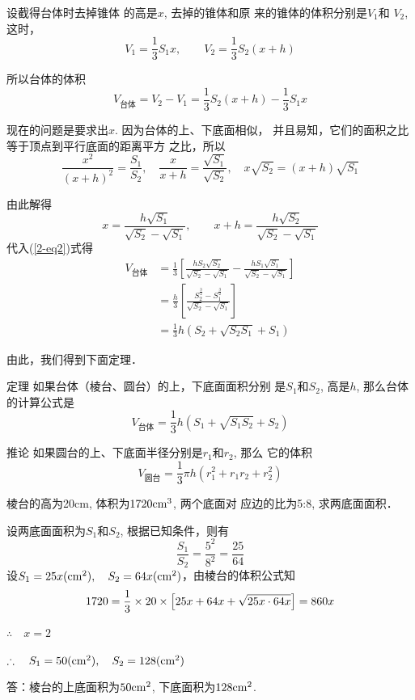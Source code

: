 设截得台体时去掉锥体
的高是$x$, 去掉的锥体和原
来的锥体的体积分别是$V_1$和
$V_2$, 这时，
\[V_1=\frac{1}{3}S_1 x,\qquad V_2=\frac{1}{3}S_2(x+h)\]

所以台体的体积
\begin{equation}\label{2-eq2}
    V_{\text{台体}}=V_2-V_1=\frac{1}{3}S_2(x+h)-\frac{1}{3}S_1x
\end{equation}

现在的问题是要求出$x$. 因为台体的上、下底面相似，
并且易知，它们的面积之比等于顶点到平行底面的距离平方
之比，所以
\[\frac{x^2}{(x+h)^2}=\frac{S_1}{S_2},\quad \frac{x}{x+h}=\frac{\sqrt{S_1}}{\sqrt{S_2}},\quad x\sqrt{S_2}=(x+h)\sqrt{S_1}\]

由此解得
\[x=\frac{h\sqrt{S_1}}{\sqrt{S_2}-\sqrt{S_1}},\qquad x+h=\frac{h\sqrt{S_2}}{\sqrt{S_2}-\sqrt{S_1}}\]
代入(\ref{2-eq2})式得
\[\begin{split}
    V_{\text{台体}}&=\frac{1}{3}\left[\frac{hS_2\sqrt{S_2}}{\sqrt{S_2}-\sqrt{S_1}}-\frac{hS_1\sqrt{S_1}}{\sqrt{S_2}-\sqrt{S_1}}\right]\\
    &=\frac{h}{3}\left[\frac{S_2^{\tfrac{3}{2}}-S_1^{\tfrac{3}{2}}}{\sqrt{S_2}-\sqrt{S_1}}\right]\\
    &=\frac{1}{3}h\left(S_2+\sqrt{S_2S_1}+S_1\right)
\end{split}\]

由此，我们得到下面定理．

\begin{blk}
{定理} 如果台体（棱台、圆台）的上，下底面面积分别
是$S_1$和$S_2$, 高是$h$, 那么台体的计算公式是
\[V_{\text{台体}}=\frac{1}{3}h\left(S_1+\sqrt{S_1S_2}+S_2\right)\]    
\end{blk}

\begin{blk}
{推论} 如果圆台的上、下底面半径分别是$r_1$和$r_2$, 那么
它的体积 
\[V_{\text{圆台}}=\frac{1}{3}\pi h(r^2_1+r_1r_2+r^2_2)\] 
\end{blk}

\begin{example}
    棱台的高为20cm, 体积为$1720{\rm cm^3}$, 两个底面对
    应边的比为5:8, 求两底面面积．
\end{example}

\begin{solution}
    设两底面面积为$S_1$和$S_2$, 根据已知条件，则有
\[\frac{S_1}{S_2}=\frac{5^2}{8^2}=\frac{25}{64}\]   
    设$S_1=25x({\rm cm^2}),\quad S_2=64x({\rm cm^2})$，由棱台的体积公式知
\[    1720=\dfrac{1}{3}\times 20\times \left[25x+64x+\sqrt{25x\cdot 64x}\right]=860x\]

$\therefore\quad x=2$

$\therefore\quad S_1=50({\rm cm^2}),\quad S_2=128({\rm cm^2})$

答：棱台的上底面积为$50{\rm cm^2}$, 下底面积为$128{\rm cm^2}$.
\end{solution}


